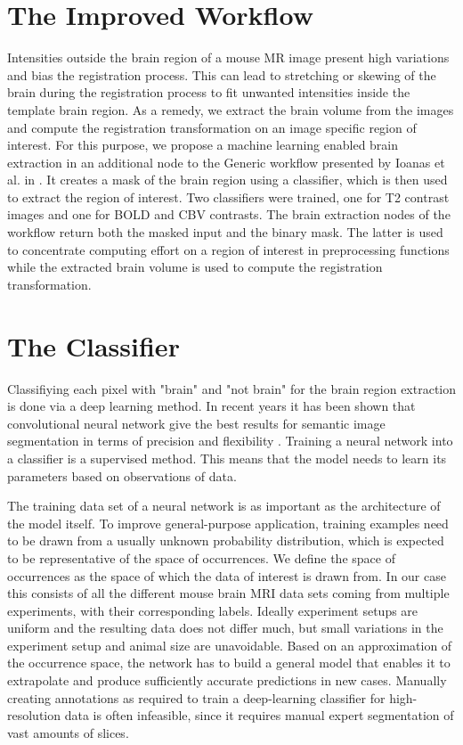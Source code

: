 \section{The Improved Workflow}

Intensities outside the brain region of a mouse MR image present high variations and bias the registration process.
This can lead to stretching or skewing of the brain during the registration process to fit unwanted intensities inside the template brain region.
As a remedy, we extract the brain volume from the images and compute the registration transformation on an image specific region of interest.
For this purpose, we propose a machine learning enabled brain extraction in an additional node to the Generic workflow presented by Ioanas et al. in \cite{ioanas_optimized_2019}.
It creates a mask of the brain region using a classifier, which is then used to extract the region of interest.
Two classifiers were trained, one for T2 contrast images and one for BOLD \cite{bold} and CBV \cite{cbv} contrasts.
The brain extraction nodes of the workflow return both the masked input and the binary mask.
The latter is used to concentrate computing effort on a region of interest in preprocessing functions while the extracted brain volume is used to compute the registration transformation.

\section{The Classifier} \label{sec:Convolutional Neural Networks}
Classifiying each pixel with "brain" and "not brain" for the brain region extraction is done via a deep learning method.
In recent years it has been shown that convolutional neural network give the best results for semantic image segmentation in terms of precision and flexibility \cite{geng_survey_2018, ronneberger_u-net:_2015}.
Training a neural network into a classifier is a supervised method.
This means that the model needs to learn its parameters based on observations of data.

The training data set of a neural network is as important as the architecture of the model itself.
To improve general-purpose application, training examples need to be drawn from a usually unknown probability distribution, which is expected to be representative of the space of occurrences.
We define the space of occurrences as the space of which the data of interest is drawn from.
In our case this consists of all the different mouse brain MRI data sets coming from multiple experiments, with their corresponding labels.
Ideally experiment setups are uniform and the resulting data does not differ much, but small variations in the experiment setup and animal size are unavoidable.
Based on an approximation of the occurrence space, the network has to build a general model that enables it to extrapolate and produce sufficiently accurate predictions in new cases.
Manually creating annotations as required to train a deep-learning classifier for high-resolution data is often infeasible, since it requires manual expert segmentation of vast amounts of slices.

